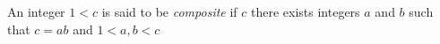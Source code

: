 \guard



\begin{defn}
\label{defn:composite}
  An integer $1<c$ is said to be \emph{composite} if $c$ there exists integers $a$ and $b$ such that $c=ab$ and $1<a,b<c$
\end{defn}
